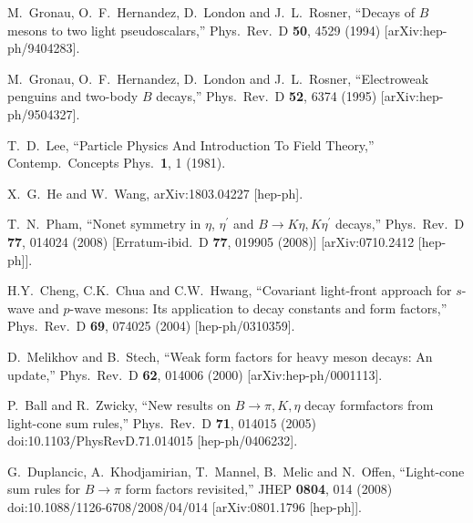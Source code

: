 \documentclass[aps,preprint,floats,epsf,epsfig,nofootinbib,letter]{revtex4}
\begin{document}
\begin{thebibliography}{99}
M.~Gronau, O.~F.~Hernandez, D.~London and J.~L.~Rosner,
``Decays of $B$ mesons to two light pseudoscalars,''
Phys.\ Rev.\ D {\bf 50}, 4529 (1994) [arXiv:hep-ph/9404283].


M.~Gronau, O.~F.~Hernandez, D.~London and J.~L.~Rosner,
``Electroweak penguins and two-body $B$ decays,''
Phys.\ Rev.\ D {\bf 52}, 6374 (1995) [arXiv:hep-ph/9504327].

  T.~D.~Lee,
  ``Particle Physics And Introduction To Field Theory,''
  Contemp.\ Concepts Phys.\  {\bf 1}, 1 (1981).

  X.~G.~He and W.~Wang,
  arXiv:1803.04227 [hep-ph].


 T.~N.~Pham,
  ``Nonet symmetry in $\eta$, $\eta^{\prime}$ and $B\to K\eta,K\eta^{\prime}$
  decays,''
  Phys.\ Rev.\  D {\bf 77}, 014024 (2008)
  [Erratum-ibid.\  D {\bf 77}, 019905 (2008)]
  [arXiv:0710.2412 [hep-ph]].


H.Y.~Cheng, C.K.~Chua and C.W.~Hwang,
  ``Covariant light-front approach for $s$-wave and $p$-wave mesons: Its
  application to decay constants and form factors,''
  Phys.\ Rev.\ D {\bf 69}, 074025 (2004)
  [hep-ph/0310359].

  D.~Melikhov and B.~Stech,
  ``Weak form factors for heavy meson decays: An update,''
  Phys.\ Rev.\ D {\bf 62}, 014006 (2000)
  [arXiv:hep-ph/0001113].

  P.~Ball and R.~Zwicky,
  ``New results on $B \to \pi, K, \eta$ decay formfactors from light-cone sum rules,''
  Phys.\ Rev.\ D {\bf 71}, 014015 (2005)
  doi:10.1103/PhysRevD.71.014015
  [hep-ph/0406232].

  G.~Duplancic, A.~Khodjamirian, T.~Mannel, B.~Melic and N.~Offen,
  ``Light-cone sum rules for $B \to \pi$ form factors revisited,''
  JHEP {\bf 0804}, 014 (2008)
  doi:10.1088/1126-6708/2008/04/014
  [arXiv:0801.1796 [hep-ph]].


\end{thebibliography}
\end{document}
